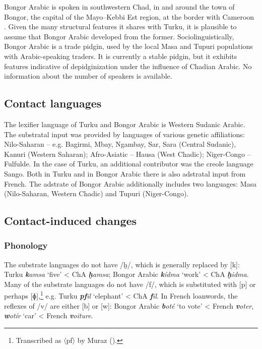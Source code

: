 \documentclass[output=paper]{langsci/langscibook}
\begin{document}
Bongor Arabic is spoken in southwestern Chad, in and around the town of Bongor, the capital of the Mayo--Kebbi Est region, at the border with Cameroon \citep{Luffin2013}. Given the many structural features it shares with Turku, it is plausible to assume that Bongor Arabic developed from the former. Sociolinguistically, Bongor Arabic is a trade pidgin, used by the local Masa and Tupuri populations with Arabic-speaking traders. It is currently a stable pidgin, but it exhibits features indicative of depidginization under the influence of Chadian Arabic. No information about the number of speakers is available.


 
 \subsection{Contact languages}


The lexifier language of Turku and Bongor Arabic is Western Sudanic Arabic. The substratal input was provided by languages of various genetic affiliations: Nilo-Saharan – e.g. Bagirmi, Mbay, Ngambay, Sar, Sara (Central Sudanic), Kanuri (Western Saharan); Afro-Asiatic – Hausa (West Chadic); Niger-Congo – Fulfulde. In the case of Turku, an additional contributor was the creole language Sango. Both in Turku and in Bongor Arabic there is also adstratal input from French. The adstrate of Bongor Arabic additionally includes two languages: Masa (Nilo-Saharan, Western Chadic) and Tupuri (Niger-Congo).


 
 \subsection{Contact-induced changes}
 \subsubsection{Phonology}

The substrate languages do not have /ḫ/, which is generally replaced by [k]: Turku \textbf{\textit{k}}\textit{amsa} ‘five’ < ChA \textbf{\textit{ḫ}}\textit{amsa}; Bongor Arabic \textbf{\textit{k}}\textit{ídma} ‘work’ < ChA \textbf{\textit{ḫ}}\textit{idma}. Many of the substrate languages do not have /f/, which is substituted with [p] or perhaps [ɸ],\footnote{Transcribed as 〈pf〉 by Muraz (\citeyear[168]{Muraz1926}).} e.g. Turku \textit{\textbf{pf}il} ‘elephant’ < ChA \textit{\textbf{f}īl}. In French loanwords, the reflexes of /v/ are either [b] or [w]: Bongor Arabic \textit{\textbf{b}oté} ‘to vote’ < French \textit{\textbf{v}oter}, \textit{\textbf{w}otír} ‘car’ < French \textit{\textbf{v}oiture}.  
\end{document}

